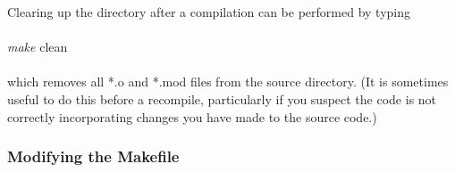 \noindent Clearing up the directory after a compilation can be performed
by typing \\~\\

{\em make} clean\\~\\

\noindent which removes all *.o and *.mod files from the source directory.
(It is sometimes useful to do this before a recompile, particularly if you 
suspect the code is not correctly incorporating changes you have made to
the source code.)

\subsubsection{Modifying the Makefile}


